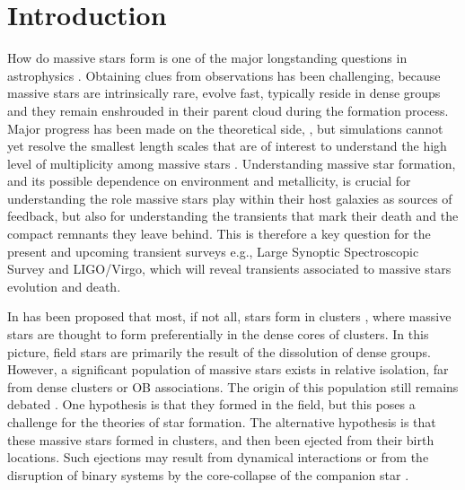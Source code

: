\documentclass[apjl,twocolumn]{emulateapj}
\newcommand{\todo}[1]{{\large $\blacksquare$~\textbf{\color{red}[#1]}}~$\blacksquare$}
\begin{document}
\maketitle{}

\section{Introduction}
\label{sec:intro}

How do massive stars form is one of the major longstanding questions in astrophysics
\citep[e.g.,][]{zinnecker:07}. Obtaining clues from observations has been challenging, because massive stars are intrinsically rare, 
evolve fast, typically reside in dense groups and they remain enshrouded in their parent cloud during the formation
process.  Major progress has been made on the theoretical side,
\citep[e.g.][]{kuiper:15,rosen:16}, but simulations cannot yet resolve
the smallest length scales that are of interest to understand the 
high level of multiplicity among massive stars  \citep[e.g.,][]{bate:09, sana:17}.  Understanding massive star formation, and its
possible dependence on environment and metallicity, is crucial for
understanding the role massive stars play within their host galaxies
as sources of feedback, but also for understanding the transients that
mark their death and the compact remnants they leave behind.  This is
therefore a key question for the present and upcoming transient
surveys e.g., Large Synoptic Spectroscopic Survey and LIGO/Virgo,
which  will reveal transients associated to massive stars
evolution and death.

In has been proposed that most, if not all, stars form in clusters \citep{lada:03}, where massive stars are thought to  form preferentially in the dense cores of clusters. In this picture, field stars are primarily the result of the dissolution of dense groups. 
However, a significant population of massive stars exists in relative
isolation,  far from dense clusters or OB associations. The origin of
this population still remains debated \citep{lamb:16,ward:18}.   One
hypothesis is that they  formed in the field, but this poses a
challenge for the theories of star formation. The alternative
hypothesis is that these massive stars formed in clusters, and then
been ejected from their birth locations. Such ejections may result
from dynamical interactions \citep[e.g.,][]{poveda:67} or from the disruption of binary systems by the core-collapse of the companion star \citep[e.g.,][]{zwicky:57, blaauw:61}. 
 
\end{document}
